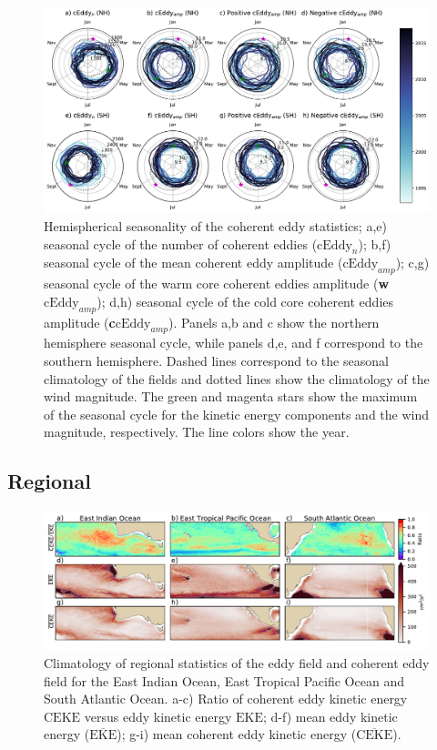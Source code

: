 \documentclass[draft,linenumbers]{agujournal2019}
\newcommand{\MEKE}{\overline{\textrm{EKE}}}
\newcommand{\EKE}{\textrm{EKE}}
\newcommand{\MCEKE}{\overline{\textrm{CEKE}}}
\newcommand{\CEKE}{\textrm{CEKE}}
\newcommand{\cEddy}{\textrm{cEddy}}
\begin{document}
	\begin{figure}
	    \centering
	    \includegraphics[width=1\textwidth]{figures/All_polar_plots_eddy_stats_polarity.pdf}
	    \caption{Hemispherical seasonality of the coherent eddy statistics;
		a,e) seasonal cycle of the number of coherent eddies ($\cEddy_n$); b,f) seasonal cycle of the mean coherent eddy amplitude ($\cEddy_{amp}$); c,g) seasonal cycle of the warm core coherent eddies amplitude (\textbf{w$\cEddy_{amp}$}); d,h) seasonal cycle of the cold core coherent eddies amplitude (\textbf{c$\cEddy_{amp}$}). Panels a,b and c show the northern hemisphere seasonal cycle, while panels d,e, and f correspond to the southern hemisphere. Dashed lines correspond to the seasonal climatology of the fields and dotted lines show the climatology of the wind magnitude. The green and magenta stars show the maximum of the seasonal cycle for the kinetic energy components and the wind magnitude, respectively. The line colors show the year.}
	    \label{fig:eddy_stats_polar}
	\end{figure}


	\subsection{Regional}
	
	\begin{figure}
	    \centering
	    \includegraphics[width=1\textwidth]{figures/regional_eke_ceke_stats_no_stats.pdf}
	    \caption{Climatology of regional statistics of the eddy field and coherent eddy field for the East Indian Ocean, East Tropical Pacific Ocean and South Atlantic Ocean. a-c) Ratio of coherent eddy kinetic energy $\CEKE$ versus eddy kinetic energy $\EKE$; d-f)  mean eddy kinetic energy ($\MEKE$); g-i) mean coherent eddy kinetic energy ($\MCEKE$).}
	    \label{fig:regional_energy_ratios}
	\end{figure}
\end{document}
